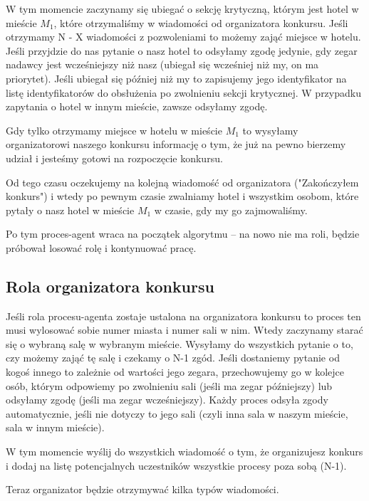 \documentclass{article}
\begin{document}
W tym momencie zaczynamy się ubiegać o sekcję krytyczną, którym jest hotel w mieście $M_{1}$, które otrzymaliśmy w wiadomości od organizatora konkursu. Jeśli otrzymamy N - X wiadomości z pozwoleniami to możemy zająć miejsce w hotelu. Jeśli przyjdzie do nas pytanie o nasz hotel to odsyłamy zgodę jedynie, gdy zegar nadawcy jest wcześniejszy niż nasz (ubiegał się wcześniej niż my, on ma priorytet). Jeśli ubiegał się później niż my to zapisujemy jego identyfikator na listę identyfikatorów do obsłużenia po zwolnieniu sekcji krytycznej. W przypadku zapytania o hotel w innym mieście, zawsze odsyłamy zgodę.

Gdy tylko otrzymamy miejsce w hotelu w mieście $M_{1}$ to wysyłamy organizatorowi naszego konkursu informację o tym, że już na pewno bierzemy udział i jesteśmy gotowi na rozpoczęcie konkursu.

Od tego czasu oczekujemy na kolejną wiadomość od organizatora ("Zakończyłem konkurs") i wtedy po pewnym czasie zwalniamy hotel i wszystkim osobom, które pytały o nasz hotel w mieście $M_{1}$ w czasie, gdy my go zajmowaliśmy.

Po tym proces-agent wraca na początek algorytmu -- na nowo nie ma roli, będzie próbował losować rolę i kontynuować pracę.

\subsection{Rola organizatora konkursu}

Jeśli rola procesu-agenta zostaje ustalona na organizatora konkursu to proces ten musi wylosować sobie numer miasta i numer sali w nim. Wtedy zaczynamy starać się o wybraną salę w wybranym mieście. Wysyłamy do wszystkich pytanie o to, czy możemy zająć tę salę i czekamy o N-1 zgód. Jeśli dostaniemy pytanie od kogoś innego to zależnie od wartości jego zegara, przechowujemy go w kolejce osób, którym odpowiemy po zwolnieniu sali (jeśli ma zegar późniejszy) lub odsyłamy zgodę (jeśli ma zegar wcześniejszy). Każdy proces odsyła zgody automatycznie, jeśli nie dotyczy to jego sali (czyli inna sala w naszym mieście, sala w innym mieście). 

W tym momencie wyślij do wszystkich wiadomość o tym, że organizujesz konkurs i dodaj na listę potencjalnych uczestników wszystkie procesy poza sobą (N-1). 

Teraz organizator będzie otrzymywać kilka typów wiadomości. 
\end{document}
